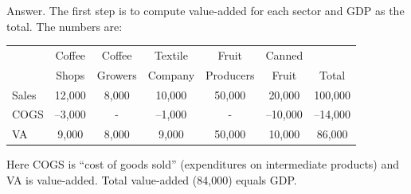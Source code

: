 \documentclass[letterpaper,12pt]{article}
\newcommand{\phm}{\phantom{--}}
\begin{document}
\begin{enumerate}
Answer.  The first step is to compute value-added for each sector
and GDP as the total.  The numbers are:
\begin{center}
\begin{tabular}{lcccccc}
\hline\hline%
            &  Coffee     & Coffee  &  Textile  &   Fruit   & Canned  \\
            &   Shops     & Growers & Company & Producers & Fruit & Total\\%

\hline\hline%
Sales   &   12,000   & 8,000   & 10,000 & 50,000 & 20,000 
                                                & 100,000\phantom{1} \\%
COGS    &   --3,000  & -    & --1,000   &   -    & --10,000\phm & --14,000\phm \\%
VA          &  \phantom{1}9,000     & 8,000     & \phantom{1}9,000  
            & 50,000 & 10,000     & 86,000\\%
\hline\hline%
\end{tabular}
\end{center}
Here COGS is ``cost of goods sold'' (expenditures on intermediate
products) and VA is value-added.  Total value-added (84,000) equals
GDP.


\end{enumerate}
\end{document}
